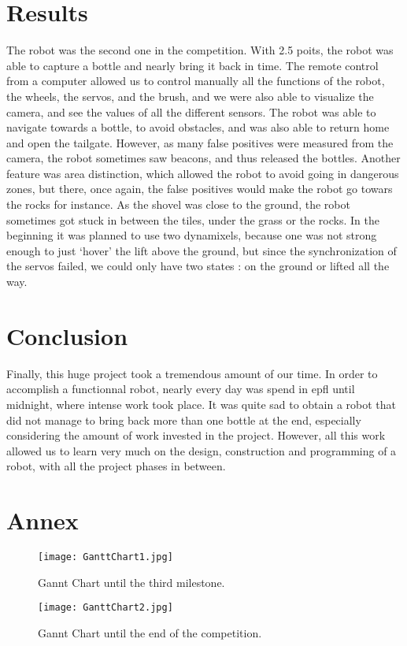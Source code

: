 \chapter{Results}
The robot was the second one in the competition. With 2.5 poits, the robot was able to capture a bottle and nearly bring it back in time. The remote control from a computer allowed us to control manually all the functions of the robot, the wheels, the servos, and the brush, and we were also able to visualize the camera, and see the values of all the different sensors. The robot was able to navigate towards a bottle, to avoid obstacles, and was also able to return home and open the tailgate. However, as many false positives were measured from the camera, the robot sometimes saw beacons, and thus released the bottles. Another feature was area distinction, which allowed the robot to avoid going in dangerous zones, but there, once again, the false positives would make the robot go towars the rocks for instance. As the shovel was close to the ground, the robot sometimes got stuck in between the tiles, under the grass or the rocks. In the beginning it was planned to use two dynamixels, because one was not strong enough to just `hover' the lift above the ground, but since the synchronization of the servos failed, we could only have two states : on the ground or lifted all the way.

\chapter{Conclusion}
Finally, this huge project took a tremendous amount of our time. In order to accomplish a functionnal robot, nearly every day was spend in epfl until midnight, where intense work took place. It was quite sad to obtain a robot that did not manage to bring back more than one bottle at the end, especially considering the amount of work invested in the project. However, all this work allowed us to learn very much on the design, construction and programming of a robot, with all the project phases in between.

\chapter{Annex}

\begin{figure}[H]
  \centering
  \texttt{[image: GanttChart1.jpg]}
  \caption{Gannt Chart until the third milestone.}
\label{fig:gannt1}
\end{figure}

\begin{figure}[H]
  \centering
  \texttt{[image: GanttChart2.jpg]}
  \caption{Gannt Chart until the end of the competition.}
\label{fig:gannt2}
\end{figure}